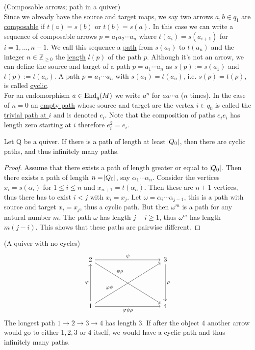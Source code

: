 \begin{definition}{(Composable arrows; path in a quiver)}\label{def:path}\\
Since we already have the source and target maps, we say two arrows $a, b \in q_{1}$ are \ul{composable} if $t(a) = s(b)$ or
$t(b) = s(a)$. In this case we can write a sequence of composable arrows $p = a_{1}a_{2}\cdots a_{n}$ where $t(a_{i}) = s(a_{i+1})$ for $i=1,\dots,n-1$.
We call this sequence a \ul{path} from $s(a_{1})$ to $t(a_{n})$ and the integer $n \in \mathbb{Z}_{\geq0}$ the \ul{length} $l(p)$ of the path $p$.
Although it's not an arrow, we can define the source and target of a path $p = a_{1}\cdots a_{n}$ as $s(p) := s(a_{1})$ and $t(p) := t(a_{n})$.
A path $p = a_{1}\cdots a_{n}$ with $s(a_{1}) = t(a_{n})$, i.e. $s(p) = t(p)$, is called \ul{cyclic}.\\
For an endomorphism $a \in \textup{End}_{q}(M)$ we write $a^{n}$ for $aa \cdots a$ ($n$ times). In the case of $n=0$ an \ul{empty path}
whose source and target are the vertex $i \in q_{0}$ is called the \ul{trivial path at $i$} and is denoted $e_{i}$. Note that the composition of paths
$e_{i}e_{i}$ has length zero starting at $i$ therefore $e_{i}^{2}=e_{i}$.
\end{definition}

\begin{lemma}\label{la:cyclic_paths}
Let Q be a quiver. If there is a path of length at least $\abs{Q_{0}}$, then there are cyclic paths,
and thus infinitely many paths.\cite{[leit4]}
\begin{proof}
Assume that there exists a path of length greater or equal to $\abs{Q_{0}}$. Then there exists a path of length $n = \abs{Q_{0}}$, say
$\alpha_{1}\cdots \alpha_{n}$. Consider the vertices $x_{i}=s(\alpha_{i})$ for $1 \leq i \leq n$ and $x_{n+1}=t(\alpha_{n})$. Then these
are $n+1$ vertices, thus there has to exist $i<j$ with $x_{i}=x_{j}$. Let $\omega=\alpha_{i}\cdots \alpha_{j-1}$, this is a path with source and target
$x_{i}=x_{j}$, thus a cyclic path. But then $\omega^{m}$ is a path for any natural number $m$. The path $\omega$ has length $j-i\geq1$, thus
$\omega^{m}$ has length $m(j-i)$. This shows that these paths are pairwise different.
\end{proof}
\end{lemma}

\begin{example}{(A quiver with no cycles)}\\
\[
\begin{tikzcd}
2 \arrow[rrrr, "\psi"] \arrow[rrrrddd, "\psi\rho", pos=0.3] &  &  &  &
3 \arrow[ddd, "\rho"] \\
 &  &  &  & \\
 &  &  &  & \\
1 \arrow[uuu, "\varphi"] \arrow[rrrruuu, "\varphi\psi", pos=0.3] \arrow[rrrr, "\varphi\psi\rho" '] &  &  &  & 4
\end{tikzcd}
\]
The longest path $1\rightarrow2\rightarrow3\rightarrow4$ has length 3. If after the object $4$ another arrow would go to either $1,2,3$ or $4$ itself,
we would have a cyclic path and thus infinitely many paths.
\end{example}


